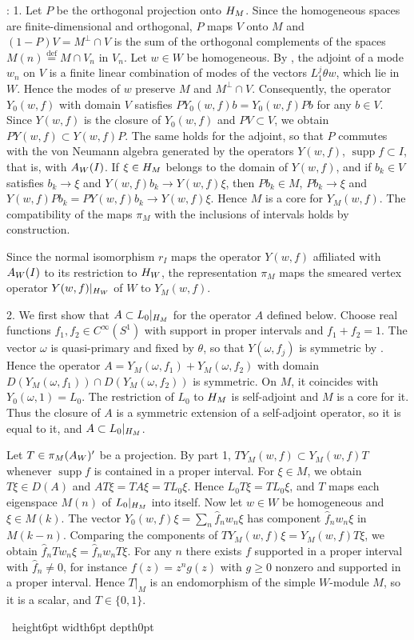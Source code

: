 \documentclass[leqno]{article}
\let\cal\relax
\newcommand{\cal}{\mathcal}
\renewcommand{\geq}{\ensuremath{\geqslant}}
\newcommand{\qed}{\hfill \vrule height6pt  width6pt depth0pt}
\newcommand{\ov}{\overset}
\newenvironment{proof}[1][]{\noindent {\it Proof #1} : }{\hbox{~}\qed
\smallskip
}
\numberwithin{equation}{section}
\begin{document}
\begin{proof}
1. Let $P$ be the orthogonal projection onto $\cal H_M$. Since the homogeneous spaces are finite-dimensional and orthogonal, $P$ maps $V$ onto $M$ and $(1-P)V = M^\perp \cap V$ is the sum of the orthogonal complements of the spaces $M(n) \ov{\mathrm{def}}{=} M \cap V_n$ in $V_n$. Let $w \in W$ be homogeneous. By \cite[(95) p.~43]{CKLW18}, the adjoint of a mode $w_n$ on $V$ is a finite linear combination of modes of the vectors $L_1^j\theta w$, which lie in $W$. Hence the modes of $w$ preserve $M$ and $M^\perp \cap V$. Consequently, the operator $Y_0(w,f)$ with domain $V$ satisfies $PY_0(w,f)b = Y_0(w,f)Pb$ for any $b \in V$. Since $Y(w,f)$ is the closure of $Y_0(w,f)$ \cite[p.~49]{CKLW18} and $PV \subset V$, we obtain $PY(w,f) \subset Y(w,f)P$. The same holds for the adjoint, so that $P$ commutes with the von Neumann algebra generated by the operators $Y(w,f)$, $\operatorname{supp} f \subset I$, that is, with $\cal A_W(I)$. If $\xi \in \cal H_M$ belongs to the domain of $Y(w,f)$, and if $b_k \in V$ satisfies $b_k \to \xi$ and $Y(w,f)b_k \to Y(w,f)\xi$, then $Pb_k \in M$, $Pb_k \to \xi$ and $Y(w,f)Pb_k = PY(w,f)b_k \to Y(w,f)\xi$. Hence $M$ is a core for $Y_M(w,f)$. The compatibility of the maps $\pi_M$ with the inclusions of intervals holds by construction.

 Since the normal isomorphism $r_I$ maps the operator $Y(w,f)$ affiliated with $\cal A_W(I)$ to its restriction to $\cal H_W$, the representation $\pi_M$ maps the smeared vertex operator $Y(w,f)|_{\cal H_W}$ of $W$ to $Y_M(w,f)$.

2. We first show that $A \subset L_0|_{\cal H_M}$ for the operator $A$ defined below. Choose real functions $f_1, f_2 \in C^\infty(S^1)$ with support in proper intervals and $f_1+f_2 = 1$. The vector $\omega$ is quasi-primary and fixed by $\theta$, so that $Y(\omega,f_j)$ is symmetric by \cite[(113) p.~50]{CKLW18}. Hence the operator $A = Y_M(\omega,f_1)+Y_M(\omega,f_2)$ with domain $D(Y_M(\omega,f_1)) \cap D(Y_M(\omega,f_2))$ is symmetric. On $M$, it coincides with $Y_0(\omega,1) = L_0$. The restriction of $L_0$ to $\cal H_M$ is self-adjoint and $M$ is a core for it. Thus the closure of $A$ is a symmetric extension of a self-adjoint operator, so it is equal to it, and $A \subset L_0|_{\cal H_M}$.

Let $T \in \pi_M(\cal A_W)'$ be a projection. By part 1, $TY_M(w,f) \subset Y_M(w,f)T$ whenever $\operatorname{supp} f$ is contained in a proper interval. For $\xi \in M$, we obtain $T\xi \in D(A)$ and $AT\xi = TA\xi = TL_0\xi$. Hence $L_0T\xi = TL_0\xi$, and $T$ maps each eigenspace $M(n)$ of $L_0|_{\cal H_M}$ into itself. Now let $w \in W$ be homogeneous and $\xi \in M(k)$. The vector $Y_0(w,f)\xi = \sum_n \hat f_n w_n\xi$ has component $\hat f_nw_n\xi$ in $M(k-n)$. Comparing the components of $TY_M(w,f)\xi = Y_M(w,f)T\xi$, we obtain $\hat f_nTw_n\xi = \hat f_nw_nT\xi$. For any $n$ there exists $f$ supported in a proper interval with $\hat f_n \neq 0$, for instance $f(z) = z^ng(z)$ with $g \geq 0$ nonzero and supported in a proper interval. Hence $T|_M$ is an endomorphism of the simple $W$-module $M$, so it is a scalar, and $T \in \{0,1\}$.


\end{proof}
\end{document}
